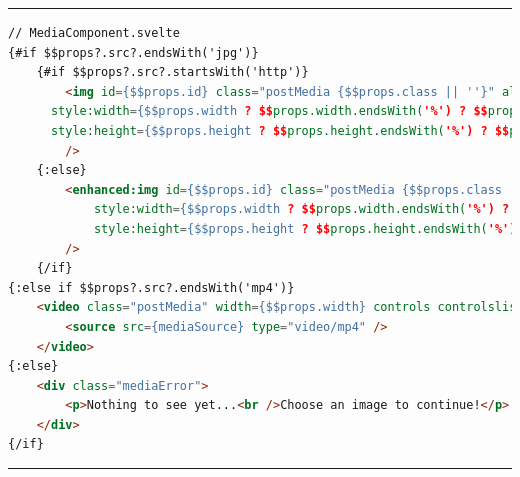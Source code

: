 \documentclass[a4paper, 12pt]{article}
\begin{document}
\vspace{0.5cm} \hrule \vspace{0.5cm}

\begin{lstlisting}[caption=MediaComponent in Svelte (Template), label={lst:Svelte:MediaComponent:Template}, language=HTML, firstnumber=24]
// MediaComponent.svelte
{#if $$props?.src?.endsWith('jpg')}
	{#if $$props?.src?.startsWith('http')}
		<img id={$$props.id} class="postMedia {$$props.class || ''}" alt={$$props.alt} src={mediaSource} loading={$$props.eagerLoading ? 'eager' : 'lazy'}
      style:width={$$props.width ? $$props.width.endsWith('%') ? $$props.width : $$props.width + 'px' : undefined}
      style:height={$$props.height ? $$props.height.endsWith('%') ? $$props.height : $$props.height + 'px' : $$props.width ? $$props.width + 'px' : undefined}
		/>
	{:else}
		<enhanced:img id={$$props.id} class="postMedia {$$props.class || ''}" alt={$$props.alt} src={mediaSource} loading={$$props.eagerLoading ? 'eager' : 'lazy'}
			style:width={$$props.width ? $$props.width.endsWith('%') ? $$props.width : $$props.width + 'px' : undefined}
			style:height={$$props.height ? $$props.height.endsWith('%') ? $$props.height : $$props.height + 'px' : $$props.width ? $$props.width + 'px' : undefined}
		/>
	{/if}
{:else if $$props?.src?.endsWith('mp4')}
	<video class="postMedia" width={$$props.width} controls controlslist="nodownload,nofullscreen,noremoteplayback" disablepictureinpicture loop muted preload={$$props.eagerLoading ? 'auto' : 'metadata'} bind:this={video}>
		<source src={mediaSource} type="video/mp4" />
	</video>
{:else}
	<div class="mediaError">
		<p>Nothing to see yet...<br />Choose an image to continue!</p>
	</div>
{/if}
\end{lstlisting}

\vspace{0.5cm} \hrule \vspace{0.5cm}
\end{document}

